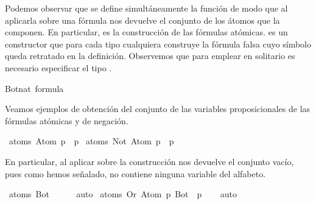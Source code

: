 \begin{isabellebody}
\begin{isamarkuptext}
Podemos observar que se define simultáneamente la función  de modo que al aplicarla 
sobre una fórmula nos devuelve el conjunto de los átomos que la componen.
En particular,  es la construcción de las fórmulas atómicas.  es un constructor que 
para cada tipo  cualquiera construye la fórmula falsa cuyo símbolo queda retratado en la definición.
Observemos que para emplear  en solitario es necesario especificar el tipo .%
\end{isamarkuptext}\isamarkuptrue%
\isamarkupfalse%
{\isachardoublequoteopen}{\isacharparenleft}Bot{\isacharcolon}{\isacharcolon}nat\ formula{\isacharparenright}{\isachardoublequoteclose}%
\begin{isamarkuptext}%
Veamos ejemplos de obtención del conjunto de las variables proposicionales de las fórmulas atómicas y 
de negación.%
\end{isamarkuptext}\isamarkuptrue%
\isamarkupfalse%
\ {\isachardoublequoteopen}atoms\ {\isacharparenleft}Atom\ p{\isacharparenright}\ {\isacharequal}\ {\isacharbraceleft}p{\isacharbraceright}{\isachardoublequoteclose}\isanewline
\isanewline
{}\isamarkupfalse%
\ {\isachardoublequoteopen}atoms\ {\isacharparenleft}Not\ {\isacharparenleft}Atom\ p{\isacharparenright}{\isacharparenright}\ {\isacharequal}\ {\isacharbraceleft}p{\isacharbraceright}{\isachardoublequoteclose}%
\begin{isamarkuptext}%
En particular, al aplicar  sobre la construcción  nos devuelve el conjunto
vacío, pues como hemos señalado, no contiene ninguna variable del alfabeto.%
\end{isamarkuptext}\isamarkuptrue%
\isamarkupfalse%
\ {\isachardoublequoteopen}atoms\ Bot\ {\isacharequal}\ {\isacharbraceleft}{\isacharbraceright}{\isachardoublequoteclose}\isanewline
%
\isadelimproof
\ \ %
\endisadelimproof
%
\isatagproof
{}\isamarkupfalse%
\ auto%
\endisatagproof
{\isafoldproof}%
%
\isadelimproof
\isanewline
%
\endisadelimproof
\isanewline
{}\isamarkupfalse%
\ {\isachardoublequoteopen}atoms\ {\isacharparenleft}Or\ {\isacharparenleft}Atom\ p{\isacharparenright}\ Bot{\isacharparenright}\ {\isacharequal}\ {\isacharbraceleft}p{\isacharbraceright}{\isachardoublequoteclose}\isanewline
%
\isadelimproof
\ \ %
\endisadelimproof
%
\isatagproof
{}\isamarkupfalse%
\ auto%
\endisatagproof
{\isafoldproof}%
%
\isadelimproof
%
\endisadelimproof
%
\begin{isamarkuptext}%

\end{isamarkuptext}
\end{isabellebody}
